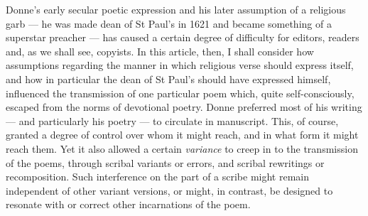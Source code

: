 \begin{paper}
Donne's early secular poetic expression and his later assumption of a
religious garb --- he was made dean of St Paul's in 1621 and became
something of a superstar preacher --- has caused a certain degree of
difficulty for editors, readers and, as we shall see, copyists. In this
article, then, I shall consider how assumptions regarding the manner in
which religious verse should express itself, and how in particular the
dean of St Paul's should have expressed himself, influenced the
transmission of one particular poem which, quite self-consciously,
escaped from the norms of devotional poetry. Donne preferred most of his
writing --- and particularly his poetry --- to circulate in manuscript.
This, of course, granted a degree of control over whom it might reach,
and in what form it might reach them. Yet it also allowed a certain
\emph{variance} to creep in to the transmission of the poems, through
scribal variants or errors, and scribal rewritings or recomposition.
Such interference on the part of a scribe might remain independent of
other variant versions, or might, in contrast, be designed to resonate
with or correct other incarnations of the poem.


\end{paper}
